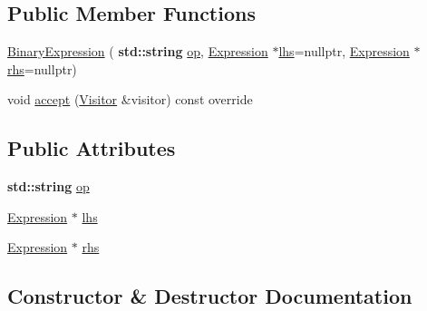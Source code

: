 \subsection*{Public Member Functions}
\begin{DoxyCompactItemize}
\item 
\hyperlink{structast_1_1_binary_expression_a07e1dc9e731ef1913deff32579929c8c}{Binary\+Expression} (\textbf{ std\+::string} \hyperlink{structast_1_1_binary_expression_a7621248e9b4f08d2987b86758a832801}{op}, \hyperlink{structast_1_1_expression}{Expression} $\ast$\hyperlink{structast_1_1_binary_expression_a1c8d523d75c0200e18b9511af135c292}{lhs}=nullptr, \hyperlink{structast_1_1_expression}{Expression} $\ast$\hyperlink{structast_1_1_binary_expression_a9f298035c5a0f9169ba7c10f2ce1722a}{rhs}=nullptr)
\item 
void \hyperlink{structast_1_1_binary_expression_ad962b349492ab7dc7365a5c6d7153d71}{accept} (\hyperlink{structast_1_1_visitor}{Visitor} \&visitor) const override
\end{DoxyCompactItemize}
\subsection*{Public Attributes}
\begin{DoxyCompactItemize}
\item 
\textbf{ std\+::string} \hyperlink{structast_1_1_binary_expression_a7621248e9b4f08d2987b86758a832801}{op}
\item 
\hyperlink{structast_1_1_expression}{Expression} $\ast$ \hyperlink{structast_1_1_binary_expression_a1c8d523d75c0200e18b9511af135c292}{lhs}
\item 
\hyperlink{structast_1_1_expression}{Expression} $\ast$ \hyperlink{structast_1_1_binary_expression_a9f298035c5a0f9169ba7c10f2ce1722a}{rhs}
\end{DoxyCompactItemize}


\subsection{Constructor \& Destructor Documentation}
\mbox{\label{structast_1_1_binary_expression_a07e1dc9e731ef1913deff32579929c8c}} 
